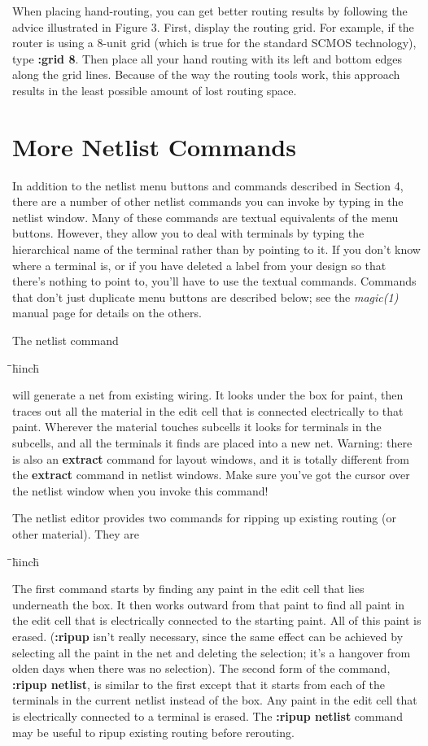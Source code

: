 \documentclass[letterpaper,twoside,12pt]{article}
\def\hinch{\hspace*{0.5in}}
\def\starti{\begin{center}\begin{tabbing}\hinch\=\hinch\=\hinch\=hinch\hinch\=\kill}
\def\endi{\end{tabbing}\end{center}}
\def\ii{\>\>\>}
\begin{document}
When placing hand-routing, you can get better routing results
by following the advice illustrated in Figure 3.  First, display
the routing grid.  For example, if the router is using a 8-unit
grid (which is true for the standard SCMOS technology), type
{\bfseries :grid 8}.  Then place all your hand routing with its left
and bottom edges along the grid lines.  Because of the way the
routing tools work, this approach results in the least possible
amount of lost routing space.

\section{More Netlist Commands}

In addition to the netlist menu buttons and commands described
in Section 4, there are a number of other netlist commands you
can invoke by typing in the netlist window.  Many of these
commands are textual equivalents of the menu buttons.  However,
they allow you to deal with terminals by typing the hierarchical
name of the terminal rather than by pointing to it.  If you
don't know where a terminal is, or if you have deleted a label
from your design so that there's nothing to point to, you'll
have to use the textual commands.  Commands that don't just
duplicate menu buttons are described below; see the
{\itshape magic(1)} manual page for details on the others.

The netlist command

\starti
   \ii {\bfseries :extract}
\endi

will generate a net from existing wiring.  It looks under the
box for paint, then traces out all the material in the edit cell
that is connected electrically to that paint.  Wherever the
material touches subcells it looks for terminals in the subcells,
and all the terminals it finds are placed into a new net.  Warning:
there is also an {\bfseries extract} command for layout windows, and it
is totally different from the {\bfseries extract} command in netlist
windows.  Make sure you've got the cursor over the netlist window
when you invoke this command!

The netlist editor provides two commands for ripping up existing
routing (or other material).  They are

\starti
   \ii {\bfseries :ripup} \\
   \ii {\bfseries :ripup netlist}
\endi

The first command starts by finding any paint in the edit cell
that lies underneath the box.  It then works outward from that
paint to find all paint in the edit cell that is electrically
connected to the starting paint.  All of this paint is erased.
({\bfseries :ripup} isn't really necessary, since the same effect can
be achieved by selecting all the paint in the net and deleting
the selection;  it's a hangover from olden days when there was
no selection).
The second form of the command, {\bfseries :ripup netlist}, is similar
to the first except that it starts from each of the terminals
in the current netlist instead of the box.  Any paint in
the edit cell that is electrically connected to a terminal
is erased.  The {\bfseries :ripup netlist} command may be useful to
ripup existing routing before rerouting.
\end{document}
